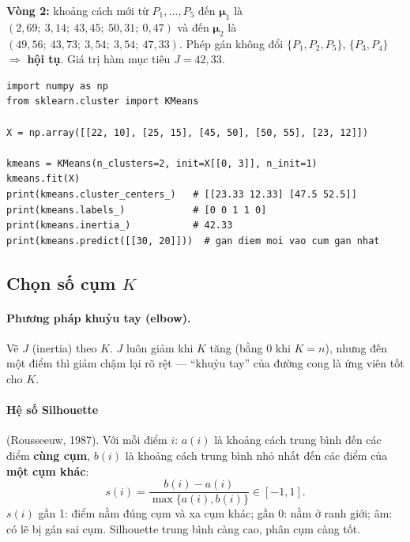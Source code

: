 \noindent\textbf{Vòng 2:} khoảng cách mới từ $P_1, \dots, P_5$ đến $\boldsymbol{\mu}_1$ là $(2{,}69;\ 3{,}14;\ 43{,}45;\ 50{,}31;\ 0{,}47)$ và đến $\boldsymbol{\mu}_2$ là $(49{,}56;\ 43{,}73;\ 3{,}54;\ 3{,}54;\ 47{,}33)$. Phép gán không đổi $\{P_1, P_2, P_5\}$, $\{P_3, P_4\}$ $\Rightarrow$ \textbf{hội tụ}. Giá trị hàm mục tiêu $J = 42{,}33$.

\begin{lstlisting}[caption={K-Means với scikit-learn (ví dụ trên lớp)}]
import numpy as np
from sklearn.cluster import KMeans

X = np.array([[22, 10], [25, 15], [45, 50], [50, 55], [23, 12]])

kmeans = KMeans(n_clusters=2, init=X[[0, 3]], n_init=1)
kmeans.fit(X)
print(kmeans.cluster_centers_)   # [[23.33 12.33] [47.5 52.5]]
print(kmeans.labels_)            # [0 0 1 1 0]
print(kmeans.inertia_)           # 42.33
print(kmeans.predict([[30, 20]]))  # gan diem moi vao cum gan nhat
\end{lstlisting}


\subsection{Chọn số cụm $K$}

\paragraph{Phương pháp khuỷu tay (elbow).} Vẽ $J$ (inertia) theo $K$. $J$ luôn giảm khi $K$ tăng (bằng 0 khi $K = n$), nhưng đến một điểm thì giảm chậm lại rõ rệt --- ``khuỷu tay'' của đường cong là ứng viên tốt cho $K$.

\paragraph{Hệ số Silhouette} (Rousseeuw, 1987). Với mỗi điểm $i$: $a(i)$ là khoảng cách trung bình đến các điểm \textbf{cùng cụm}, $b(i)$ là khoảng cách trung bình nhỏ nhất đến các điểm của \textbf{một cụm khác}:
\begin{equation}
    s(i) = \frac{b(i) - a(i)}{\max\{a(i), b(i)\}} \in [-1, 1].
\end{equation}
$s(i)$ gần 1: điểm nằm đúng cụm và xa cụm khác; gần 0: nằm ở ranh giới; âm: có lẽ bị gán sai cụm. Silhouette trung bình càng cao, phân cụm càng tốt.

